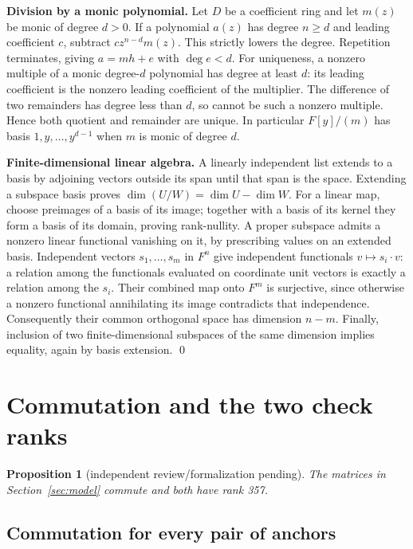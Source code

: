 \documentclass{article}
\newtheorem{proposition}{Proposition}
\begin{document}
\textbf{Division by a monic polynomial.} Let \(D\) be a coefficient ring and let
\(m(z)\) be monic of degree \(d > 0\). If a polynomial \(a(z)\) has degree \(n \ge d\) and
leading coefficient \(c\), subtract \(c z^{n-d} m(z)\). This strictly lowers the degree.
Repetition terminates, giving \(a = mh + e\) with \(\deg e < d\). For uniqueness, a nonzero
multiple of a monic degree-\(d\) polynomial has degree at least \(d\): its leading
coefficient is the nonzero leading coefficient of the multiplier. The difference of two
remainders has degree less than \(d\), so cannot be such a nonzero multiple. Hence both
quotient and remainder are unique. In particular \(F[y]/(m)\) has basis
\(1, y, \dots, y^{d-1}\) when \(m\) is monic of degree \(d\).

\textbf{Finite-dimensional linear algebra.} A linearly independent list extends to a basis by
adjoining vectors outside its span until that span is the space. Extending a subspace basis proves
\(\dim(U/W) = \dim U - \dim W\). For a linear map, choose preimages of a basis of its image;
together with a basis of its kernel they form a basis of its domain, proving rank-nullity. A
proper subspace admits a nonzero linear functional vanishing on it, by prescribing values on
an extended basis. Independent vectors \(s_1, \dots, s_m\) in \(F^n\) give independent
functionals \(v \mapsto s_i \cdot v\): a relation among the functionals evaluated on
coordinate unit vectors is exactly a relation among the \(s_i\). Their combined map onto
\(F^m\) is surjective, since otherwise a nonzero functional annihilating its image
contradicts that independence. Consequently their common orthogonal space has dimension
\(n - m\). Finally, inclusion of two finite-dimensional subspaces of the same dimension
implies equality, again by basis extension. \qed

\section{Commutation and the two check ranks}\label{sec:ranks}

\begin{proposition}[independent review\slash formalization pending]\label{prop:ranks}
  The matrices in Section~\ref{sec:model} commute and both have rank 357.
\end{proposition}

\subsection{Commutation for every pair of anchors}\label{sec:commutation}
\end{document}
